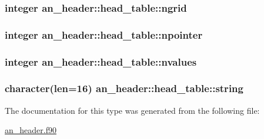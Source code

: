 \subsubsection[{ngrid}]{\setlength{\rightskip}{0pt plus 5cm}integer an\+\_\+header\+::head\+\_\+table\+::ngrid}\label{structan__header_1_1head__table_acc79dab7891f45424b13bf4f0f179585}
\hypertarget{structan__header_1_1head__table_ad73cf9ac7e4131420e4303aa425b183f}{}
\subsubsection[{npointer}]{\setlength{\rightskip}{0pt plus 5cm}integer an\+\_\+header\+::head\+\_\+table\+::npointer}\label{structan__header_1_1head__table_ad73cf9ac7e4131420e4303aa425b183f}
\hypertarget{structan__header_1_1head__table_a75d0ca98f45425fdb8df177b5c2458e5}{}
\subsubsection[{nvalues}]{\setlength{\rightskip}{0pt plus 5cm}integer an\+\_\+header\+::head\+\_\+table\+::nvalues}\label{structan__header_1_1head__table_a75d0ca98f45425fdb8df177b5c2458e5}
\hypertarget{structan__header_1_1head__table_a1be9d5f56131baf037a9da190f74189e}{}
\subsubsection[{string}]{\setlength{\rightskip}{0pt plus 5cm}character(len=16) an\+\_\+header\+::head\+\_\+table\+::string}\label{structan__header_1_1head__table_a1be9d5f56131baf037a9da190f74189e}


The documentation for this type was generated from the following file\+:\begin{DoxyCompactItemize}
\item 
\hyperlink{an__header_8f90}{an\+\_\+header.\+f90}\end{DoxyCompactItemize}
